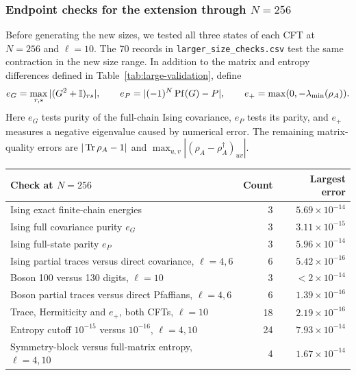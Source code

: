 \subsubsection{Endpoint checks for the extension through \texorpdfstring{$N=256$}{N=256}}
\label{sec:n256-sanity}
Before generating the new sizes, we tested all three states of each CFT
at $N=256$ and $\ell=10$. The 70 records in
\texttt{larger\_size\_checks.csv} test the same contraction in the new
size range. In addition to the matrix and entropy differences defined
in Table~\ref{tab:large-validation}, define
\begin{equation}
 e_G=\max_{r,s}|(G^2+\mathbb I)_{rs}|,\qquad
 e_P=|(-1)^N\operatorname{Pf}(G)-P|,\qquad
 e_+=\max(0,-\lambda_{\min}(\rho_A)).
 \label{eq:n256-diagnostics}
\end{equation}
Here $e_G$ tests purity of the full-chain Ising covariance, $e_P$ tests
its parity, and $e_+$ measures a negative eigenvalue caused by numerical
error. The remaining matrix-quality errors are $|\operatorname{Tr}\rho_A-1|$ and
$\max_{u,v}|(\rho_A-\rho_A^\dagger)_{uv}|$.
\begin{center}
\begin{minipage}{\linewidth}\small
\captionsetup{type=table}
\begin{tabular}{p{.61\linewidth}rr}\toprule
Check at $N=256$ & Count & Largest error\\\midrule
Ising exact finite-chain energies &3&$5.69\times10^{-14}$\\
Ising full covariance purity $e_G$ &3&$3.11\times10^{-15}$\\
Ising full-state parity $e_P$ &3&$5.96\times10^{-14}$\\
Ising partial traces versus direct covariance, $\ell=4,6$ &6&$5.42\times10^{-16}$\\
Boson 100 versus 130 digits, $\ell=10$ &3&$<2\times10^{-14}$\\
Boson partial traces versus direct Pfaffians, $\ell=4,6$ &6&$1.39\times10^{-16}$\\
Trace, Hermiticity and $e_+$, both CFTs, $\ell=10$ &18&$2.19\times10^{-16}$\\
Entropy cutoff $10^{-15}$ versus $10^{-16}$, $\ell=4,10$ &24&$7.93\times10^{-14}$\\
Symmetry-block versus full-matrix entropy, $\ell=4,10$ &4&$1.67\times10^{-14}$\\\bottomrule
\end{tabular}
\caption{All 70 endpoint checks for the extension to $N=256$. State
checks cover all three primaries per model; entropy-threshold checks
cover all six directions. Full-matrix comparisons use Ising
$\sigma\mid\eps$ and boson $ss\mid3s,s$. Errors use
Eq.~\eqref{eq:n256-diagnostics} and the entrywise/scalar conventions of
Table~\ref{tab:large-validation}. The precision row gives the validation
tolerance for final complex double-precision matrices, not a claim of
100-digit precision in the returned matrix.}
\label{tab:n256-validation}
\end{minipage}
\end{center}
